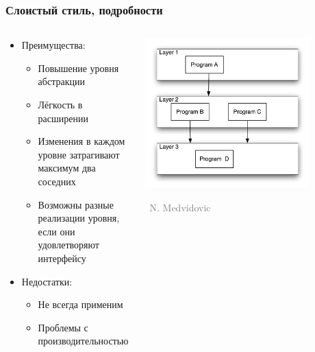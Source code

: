 \documentclass[xetex,mathserif,serif]{beamer}
\newcommand{\attribution}[1] {
	\vspace{-5mm}\begin{flushright}\begin{scriptsize}\textcolor{gray}{\textcopyright\, #1}\end{scriptsize}\end{flushright}
}
\begin{document}
	\begin{frame}
		\frametitle{Слоистый стиль, подробности}
		\begin{columns}
			\begin{column}{0.5\textwidth}
				\begin{itemize}
					\item Преимущества:
					\begin{itemize}
						\item Повышение уровня абстракции
						\item Лёгкость в расширении
						\item Изменения в каждом уровне затрагивают максимум два соседних
						\item Возможны разные реализации уровня, если они удовлетворяют интерфейсу
					\end{itemize}
					\item Недостатки:
					\begin{itemize}
						\item Не всегда применим
						\item Проблемы с производительностью
					\end{itemize}
				\end{itemize}
			\end{column}
			\begin{column}{0.5\textwidth}
				\begin{center}
					\includegraphics[width=0.8\textwidth]{layered.png}
					\attribution{N. Medvidovic}
				\end{center}
			\end{column}
		\end{columns}
	\end{frame}
\end{document}
